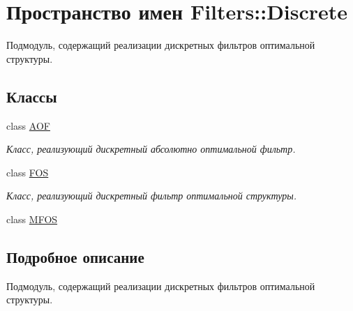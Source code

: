 \hypertarget{namespace_filters_1_1_discrete}{}\section{Пространство имен Filters\+:\+:Discrete}
\label{namespace_filters_1_1_discrete}


Подмодуль, содержащий реализации дискретных фильтров оптимальной структуры.  


\subsection*{Классы}
\begin{DoxyCompactItemize}
\item 
class \hyperlink{class_filters_1_1_discrete_1_1_a_o_f}{A\+OF}
\begin{DoxyCompactList}\small\item\em Класс, реализующий дискретный абсолютно оптимальной фильтр. \end{DoxyCompactList}\item 
class \hyperlink{class_filters_1_1_discrete_1_1_f_o_s}{F\+OS}
\begin{DoxyCompactList}\small\item\em Класс, реализующий дискретный фильтр оптимальной структуры. \end{DoxyCompactList}\item 
class \hyperlink{class_filters_1_1_discrete_1_1_m_f_o_s}{M\+F\+OS}
\end{DoxyCompactItemize}


\subsection{Подробное описание}
Подмодуль, содержащий реализации дискретных фильтров оптимальной структуры. 